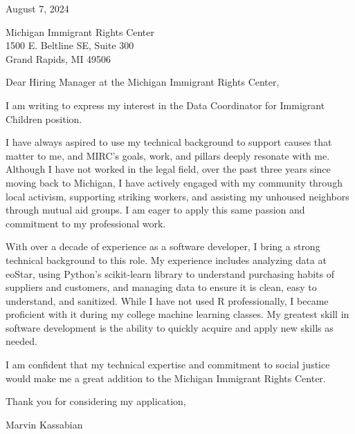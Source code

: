 \documentclass{../styles/coverletter}
\begin{document}
\populatedtitle

August 7, 2024\newline

Michigan Immigrant Rights Center\\
1500 E. Beltline SE, Suite 300\\
Grand Rapids, MI 49506\newline

Dear Hiring Manager at the Michigan Immigrant Rights Center,\newline

I am writing to express my interest in the Data Coordinator for Immigrant Children position.\newline

I have always aspired to use my technical background to support causes that matter to me, and MIRC's goals, work, and pillars deeply resonate with me. Although I have not worked in the legal field, over the past three years since moving back to Michigan, I have actively engaged with my community through local activism, supporting striking workers, and assisting my unhoused neighbors through mutual aid groups. I am eager to apply this same passion and commitment to my professional work.\newline

With over a decade of experience as a software developer, I bring a strong technical background to this role. My experience includes analyzing data at eoStar, using Python’s scikit-learn library to understand purchasing habits of suppliers and customers, and managing data to ensure it is clean, easy to understand, and sanitized. While I have not used R professionally, I became proficient with it during my college machine learning classes. My greatest skill in software development is the ability to quickly acquire and apply new skills as needed.\newline

I am confident that my technical expertise and commitment to social justice would make me a great addition to the Michigan Immigrant Rights Center.\newline

Thank you for considering my application,

Marvin Kassabian
\end{document}
